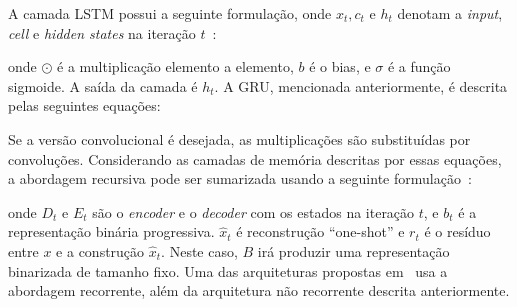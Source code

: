 A camada \acrshort{LSTM} possui a seguinte formulação, onde $x_t, c_t \textrm{ e } h_t$ denotam a \textit{input}, \textit{cell} e \textit{hidden states} na iteração $t$~\cite{FullResolution2017Toderici}:


\noindent onde $\odot$ é a multiplicação elemento a elemento, $b$ é o bias, e $\sigma$ é a função sigmoide. A saída da camada é $h_t$. A \acrshort{GRU}, mencionada anteriormente, é descrita pelas seguintes equações:

Se a versão convolucional é desejada, as multiplicações são substituídas por convoluções. Considerando as camadas de memória descritas por essas equações, a abordagem recursiva pode ser sumarizada usando a seguinte formulação~\cite{FullResolution2017Toderici}:

\noindent onde $D_t$ e $E_t$ são o \textit{encoder} e o \textit{decoder} com os estados na iteração $t$, e $b_t$ é a representação binária progressiva. $\hat{x}_t$ é reconstrução ``one-shot'' e $r_t$ é o resíduo entre $x$ e a construção $\hat{x}_t$. Neste caso, $B$ irá produzir uma representação binarizada de tamanho fixo. Uma das arquiteturas propostas em~\cite{Variable2016Toderici} usa a abordagem recorrente, além da arquitetura não recorrente descrita anteriormente.

